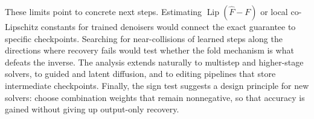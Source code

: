 These limits point to concrete next steps. Estimating $\operatorname{Lip}(\widehat F-F)$ or local co-Lipschitz constants for trained denoisers would connect the exact guarantee to specific checkpoints. Searching for near-collisions of learned steps along the directions where recovery fails would test whether the fold mechanism is what defeats the inverse. The analysis extends naturally to multistep and higher-stage solvers, to guided and latent diffusion, and to editing pipelines that store intermediate checkpoints. Finally, the sign test suggests a design principle for new solvers: choose combination weights that remain nonnegative, so that accuracy is gained without giving up output-only recovery.
